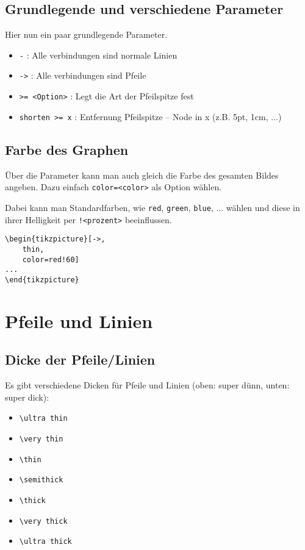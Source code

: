 \documentclass{article}
\begin{document}
	\subsection{Grundlegende und verschiedene Parameter}
		Hier nun ein paar grundlegende Parameter.
		\begin{itemize}
			\item \texttt{-} : Alle verbindungen sind normale Linien
			\item \texttt{->} : Alle verbindungen sind Pfeile
			\item \texttt{>= <Option>} : Legt die Art der Pfeilspitze fest
			\item \texttt{shorten >= x} : Entfernung Pfeilspitze -- Node in x (z.B. 5pt, 1cm, ...)
		\end{itemize}
	\subsection{Farbe des Graphen}
		Über die Parameter kann man auch gleich die Farbe des gesamten Bildes angeben. Dazu einfach \texttt{color=<color>} als Option wählen. 
		
		Dabei kann man Standardfarben, wie \texttt{red}, \texttt{green}, \texttt{blue}, ... wählen und diese in ihrer Helligkeit per \texttt{!<prozent>} beeinflussen.\\
		\begin{minipage}{\linewidth}
			\begin{lstlisting}[caption={Wählen einer hell roten Farbe (60\% rot, 40\% weiß/hintergrund)}]
\begin{tikzpicture}[->,
	thin,
	color=red!60]
...
\end{tikzpicture}
			\end{lstlisting}
		\end{minipage}
	\section{Pfeile und Linien}
	\subsection{Dicke der Pfeile/Linien}
		Es gibt verschiedene Dicken für Pfeile und Linien (oben: super dünn, unten: super dick):
		\begin{itemize}	
			\item \texttt{\textbackslash ultra thin}
			\item \texttt{\textbackslash very thin}
			\item \texttt{\textbackslash thin}
			\item \texttt{\textbackslash semithick}
			\item \texttt{\textbackslash thick}
			\item \texttt{\textbackslash very thick}
			\item \texttt{\textbackslash ultra thick}
		\end{itemize}
\end{document}
